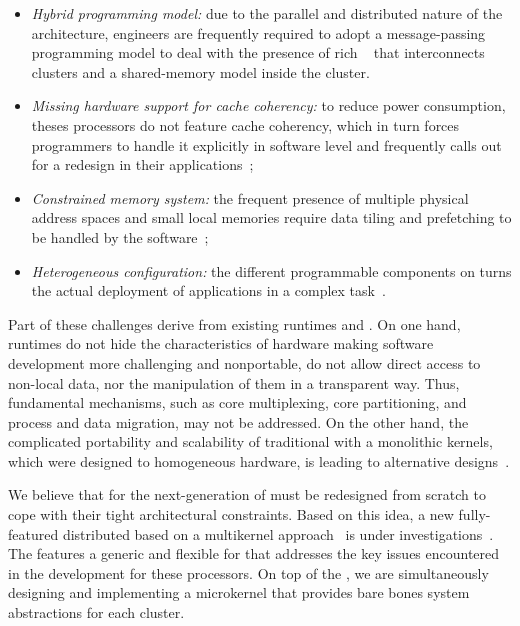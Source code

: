 	\begin{itemize}
		\item \textit{Hybrid programming model:} due to the parallel and
		distributed nature of the architecture, engineers are frequently
		required to adopt a message-passing programming model to deal
		with the presence of rich \nocs~\cite{kelly2013} that
		interconnects clusters and a shared-memory model inside the
		cluster.

		\item \textit{Missing hardware support for cache coherency:} to
		reduce power consumption, theses processors do not feature cache
		coherency, which in turn forces programmers to handle it
		explicitly in software level and frequently calls out for a
		redesign in their applications~\cite{francesquini2015};

		\item \textit{Constrained memory system:} the frequent presence
		of multiple physical address spaces and small local memories
		require data tiling and prefetching to be handled by the
		software~\cite{Castro2016};

		\item \textit{Heterogeneous configuration:} the different
		programmable components on \lightweight \manycores turns the
		actual deployment of applications in a complex
		task~\cite{barbalace2015}.
	\end{itemize}

	Part of these challenges derive from existing runtimes and \oss.
	On one hand, runtimes do not hide the characteristics of hardware
	making software development more challenging and nonportable, \eg do
	not allow direct access to non-local data, nor the manipulation of
	them in a transparent way.  Thus, fundamental \os mechanisms, such
	as core multiplexing, core partitioning, and process and data
	migration, may not be addressed.  On the other hand, the complicated
	portability and scalability of traditional \oss with a monolithic
	kernels, which were designed to homogeneous hardware, is leading to
	alternative \os designs~\cite{Baumann2009, kluge2014,
		nightingale2009, rhoden2011}.

	We believe that \oss for the next-generation of \lightweight
	\manycores must be redesigned from scratch to cope with their tight
	architectural constraints.  Based on this idea, a new fully-featured
	distributed \os based on a multikernel approach~\cite{Baumann2009}
	is under investigations~\cite{penna2017-1,penna2017-2,penna2019}.
	The \nanvix \multikernel features a generic and flexible \hal for
	\lightweight \manycores that addresses the key issues encountered in
	the development for these processors.  On top of the \nanvix
	\textit{\hal}, we are simultaneously designing and implementing a
	microkernel that provides bare bones system abstractions for each
	cluster.

